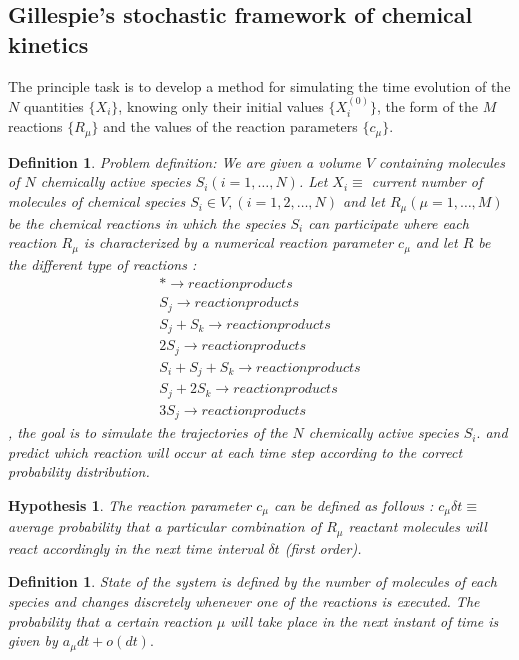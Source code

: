 \documentclass[11pt,a4paper]{article}
\newtheorem{defn}[theorem]{Definition}
\newtheorem{hyp}[theorem]{Hypothesis}
\begin{document}
\subsection{Gillespie's stochastic framework of chemical kinetics}
The principle task is to develop a method for simulating the time evolution of the $N$ quantities $\{X_{i}\}$, knowing only their initial values $\{X_{i}^{(0)}\}$, the form of the $M$ reactions $\{R_{\mu}\}$ and the values of the reaction parameters $\{c_{\mu}\}$.

\begin{defn}{Problem definition:}
We are given a volume $V$ containing molecules of $N$ chemically active species $S_{i}(i = 1, \dots, N)$. Let $X_{i} \equiv$ current number of molecules of chemical species $S_{i} \in V, (i = 1, 2, \dots, N)$ and let $R_{\mu} (\mu = 1, \dots, M)$ be the chemical reactions in which the species $S_{i}$ can participate where each reaction $R_{\mu}$ is characterized by a numerical reaction parameter $c_{\mu}$ and let $R$ be the different type of reactions :
\begin{gather}
  {* \rightarrow reaction products}  \\
  {S_{j} \rightarrow reaction products} \\
  {S_{j} + S_{k} \rightarrow reaction products}\\
  {2S_{j} \rightarrow reaction products} \\
  {S_{i} + S_{j} + S_{k} \rightarrow reaction products}\\
  {S_{j} + 2S_{k} \rightarrow reaction products} \\
  {3S_{j} \rightarrow reaction products}
\end{gather} , the goal is to simulate the trajectories of the $N$ chemically active species $S_i.$ and predict which reaction will occur at each time step according to the correct probability distribution.
\end{defn}

\begin{hyp}{}
The reaction parameter $c_{\mu}$ can be defined as follows : $c_{\mu} \delta t \equiv $ average probability that a particular combination of $R_{\mu}$ reactant molecules will react accordingly in the next time interval $\delta t$ (first order).
\end{hyp}

\begin{defn}State of the system is defined by the number of molecules of each species and changes discretely whenever one of the reactions is executed. The probability that a certain reaction $\mu$ will take place in the next instant of time is given by $a_{\mu}dt + o(dt).$
\end{defn}
\end{document}
